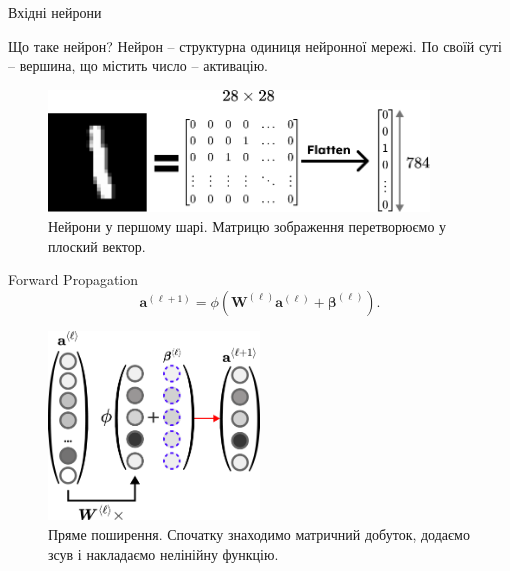 \documentclass{zkdl-presentation-template}
\begin{document}
    \begin{frame}{Вхідні нейрони}
        \begin{block}{Що таке нейрон?}
            Нейрон -- структурна одиниця нейронної мережі. По своїй суті -- вершина, що містить число -- активацію.
        \end{block}
    
        \begin{figure}
            \centering
            \includegraphics[width=0.9\textwidth]{images/flatten.png}
            \caption{Нейрони у першому шарі. Матрицю зображення перетворюємо у плоский вектор.}
        \end{figure}
    \end{frame}
    \begin{frame}{Forward Propagation}
        \begin{equation*}
            \boldsymbol{a}^{(\ell+1)} = \phi\left(\boldsymbol{W}^{(\ell)}\boldsymbol{a}^{(\ell)} + \boldsymbol{\beta}^{(\ell)}\right).
        \end{equation*}
        \begin{figure}
            \centering
            \includegraphics[width=0.5\textwidth]{images/forward_prop.png}
            \caption{Пряме поширення. Спочатку знаходимо матричний добуток, додаємо зсув і накладаємо нелінійну функцію.}
        \end{figure}
    \end{frame}
\end{document}
